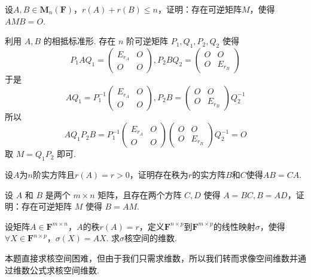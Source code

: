 \begin{exercise}
\begin{exgroup}
        \item 设$A,B \in \mathbf{M}_n(\mathbf{F})$，$r(A)+r(B) \leqslant n$，证明：存在可逆矩阵$M$，使得$AMB=O$.
        \begin{answer}
            利用 $A,B$ 的相抵标准形. 存在 $n$ 阶可逆矩阵 $P_1,Q_1,P_2,Q_2$ 使得
          \[P_1AQ_1=\begin{pmatrix}E_{r_A} & O \\ O & O\end{pmatrix},P_2BQ_2=\begin{pmatrix}O & O \\ O & E_{r_B}\end{pmatrix}\]
          于是 \[AQ_1=P_1^{-1}\begin{pmatrix}E_{r_A} & O \\ O & O\end{pmatrix},P_2B=\begin{pmatrix}O & O \\ O & E_{r_B}\end{pmatrix}Q_2^{-1}\]
          所以 \[AQ_1P_2B=P_1^{-1}\begin{pmatrix}E_{r_A} & O \\ O & O\end{pmatrix}\begin{pmatrix}O & O \\ O & E_{r_B}\end{pmatrix}Q_2^{-1}=O\]
          取 $M=Q_1P_2$ 即可.
        \end{answer}

        \item 设$A$为$n$阶实方阵且$r(A)=r>0$，证明存在秩为$r$的实方阵$B$和$C$使得$AB=CA$.
        \begin{answer}

        \end{answer}

        \item 设 $A$ 和 $B$ 是两个 $m \times n$ 矩阵，且存在两个方阵 $C,D$ 使得 $A = BC, B = AD$，证明：存在可逆矩阵 $M$ 使得 $B = AM$.
        \begin{answer}

        \end{answer}
    \end{exgroup}

    \begin{exgroup}
        \item 设矩阵$A \in \mathbf{F}^{m \times n}$，$A$的秩$r(A)=r$，定义$\mathbf{F}^{n \times p}$到$\mathbf{F}^{m \times p}$的线性映射$\sigma$，使得$\forall X \in \mathbf{F}^{n \times p}$，$\sigma(X)=AX$. 求$\sigma$核空间的维数.
        \begin{answer}
            本题直接求核空间困难，但由于我们只需求维数，所以我们转而求像空间维数并通过维数公式求核空间维数.


\end{answer}
\end{exgroup}
\end{exercise}
